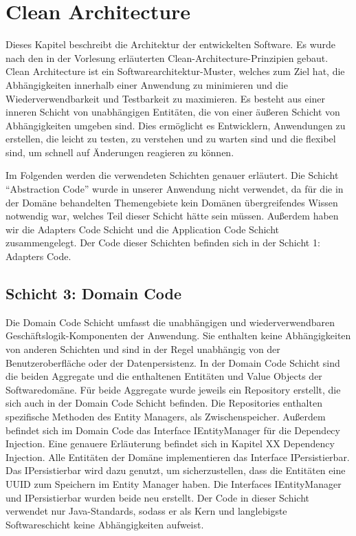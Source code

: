 \chapter{Clean Architecture}

Dieses Kapitel beschreibt die Architektur der entwickelten Software. Es wurde nach den in der Vorlesung erläuterten Clean-Architecture-Prinzipien gebaut. Clean Architecture ist ein Softwarearchitektur-Muster, welches zum Ziel hat, die Abhängigkeiten innerhalb einer Anwendung zu minimieren und die Wiederverwendbarkeit und Testbarkeit zu maximieren. Es besteht aus einer inneren Schicht von unabhängigen Entitäten, die von einer äußeren Schicht von Abhängigkeiten umgeben sind. Dies ermöglicht es Entwicklern, Anwendungen zu erstellen, die leicht zu testen, zu verstehen und zu warten sind und die flexibel sind, um schnell auf Änderungen reagieren zu können.

Im Folgenden werden die verwendeten Schichten genauer erläutert. Die Schicht \enquote{Abstraction Code} wurde in unserer Anwendung nicht verwendet, da für die in der Domäne behandelten Themengebiete kein Domänen übergreifendes Wissen notwendig war, welches Teil dieser Schicht hätte sein müssen. 
Außerdem haben wir die Adapters Code Schicht und die Application Code Schicht zusammengelegt. Der Code dieser Schichten befinden sich in der Schicht 1: Adapters Code.

\section{Schicht 3: Domain Code}
Die Domain Code Schicht umfasst die unabhängigen und wiederverwendbaren Geschäftslogik-Komponenten der Anwendung. Sie enthalten keine Abhängigkeiten von anderen Schichten und sind in der Regel unabhängig von der Benutzeroberfläche oder der Datenpersistenz.
In der Domain Code Schicht sind die beiden Aggregate und die enthaltenen Entitäten und Value Objects der Softwaredomäne. Für beide Aggregate wurde jeweils ein Repository erstellt, die sich auch in der Domain Code Schicht befinden. Die Repositories enthalten spezifische Methoden des Entity Managers, als Zwischenspeicher.  Außerdem befindet sich im Domain Code das Interface IEntityManager für die Dependecy Injection. Eine genauere Erläuterung befindet sich in Kapitel XX Dependency Injection. Alle Entitäten der Domäne implementieren das Interface IPersistierbar. Das IPersistierbar wird dazu genutzt, um sicherzustellen, dass die Entitäten eine UUID zum Speichern im Entity Manager haben.
Die Interfaces IEntityManager und IPersistierbar wurden beide neu erstellt.
Der Code in dieser Schicht verwendet nur Java-Standards, sodass er als Kern und langlebigste Softwareschicht keine Abhängigkeiten aufweist.

